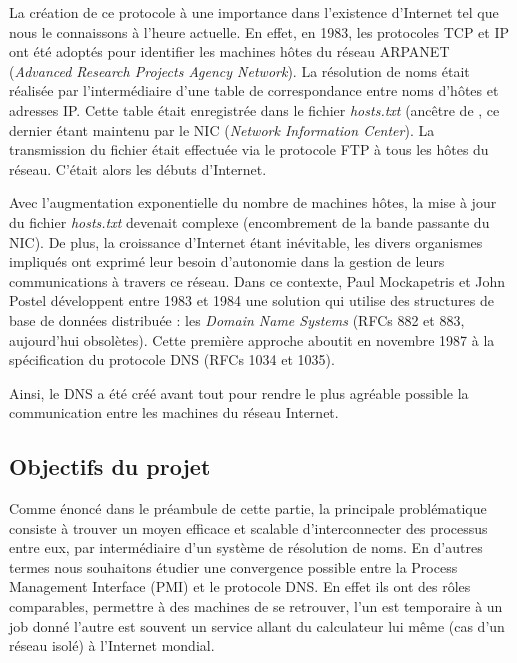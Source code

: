 \documentclass[12pt,a4paper]{article}
\begin{document}
\quad La création de ce protocole à une importance dans l’existence d’Internet tel que nous le connaissons à l’heure actuelle. En effet, en 1983, les protocoles TCP et IP ont été adoptés pour identifier les machines hôtes du réseau ARPANET (\textit{Advanced Research Projects Agency Network}). La résolution de noms était réalisée par l’intermédiaire d’une table de correspondance entre noms d’hôtes et adresses IP. Cette table était enregistrée dans le fichier \textit{hosts.txt} (ancêtre de , ce dernier étant maintenu par le NIC (\textit{Network Information Center}). La transmission du fichier était effectuée via le protocole FTP à tous les hôtes du réseau. C’était alors les débuts d’Internet.

\quad Avec l’augmentation exponentielle du nombre de machines hôtes, la mise à jour du fichier \textit{hosts.txt} devenait complexe (encombrement de la bande passante du NIC). De plus, la croissance d’Internet étant inévitable, les divers organismes impliqués ont exprimé leur besoin d’autonomie dans la gestion de leurs communications à travers ce réseau. Dans ce contexte, Paul Mockapetris et John Postel développent entre 1983 et 1984 une solution qui utilise des structures de base de données distribuée : les \textit{Domain Name Systems} (RFCs 882 et 883, aujourd’hui obsolètes). Cette première approche aboutit en novembre 1987 à la spécification du protocole DNS (RFCs 1034 et 1035).

\qaud Ainsi, le DNS a été créé avant tout pour rendre le plus agréable possible la communication entre les machines du réseau Internet.

\subsection{Objectifs du projet}

\quad Comme énoncé dans le préambule de cette partie, la principale problématique consiste à trouver un moyen efficace et scalable d’interconnecter des processus entre eux, par intermédiaire d’un système de résolution de noms. En d'autres termes nous souhaitons étudier une convergence possible entre la Process Management Interface (PMI) et le protocole DNS. En effet ils ont des rôles comparables, permettre à des machines de se retrouver, l'un est temporaire à un job donné l'autre est souvent un service allant du calculateur lui même (cas d'un réseau isolé) à l'Internet mondial.
\end{document}
